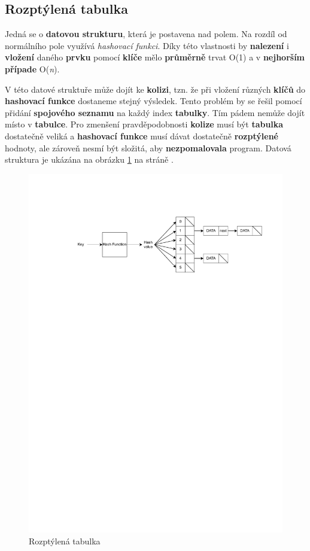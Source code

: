 \documentclass[12pt]{report}
\begin{document}
		\subsection{Rozptýlená tabulka}
			
			Jedná se o \textbf{datovou strukturu}, která je postavena nad polem. Na rozdíl od normálního pole využívá \textit{hashovací funkci}. Díky této vlastnosti by \textbf{nalezení} i \textbf{vložení} daného \textbf{prvku} pomocí \textbf{klíče} mělo \textbf{průměrně} trvat O(1) a v \textbf{nejhorším případe} O(\textit{n}).
			
			V této datové struktuře může dojít ke \textbf{kolizi}, tzn. že při vložení různých \textbf{klíčů} do \textbf{hashovací funkce} dostaneme stejný výsledek. Tento problém by se řešil pomocí přidání \textbf{spojového seznamu} na každý index \textbf{tabulky}. Tím pádem nemůže dojít místo v \textbf{tabulce}. Pro zmenšení pravděpodobnosti \textbf{kolize} musí být \textbf{tabulka} dostatečně veliká a \textbf{hashovací funkce} musí dávat dostatečně \textbf{rozptýlené} hodnoty, ale zároveň nesmí být složitá, aby \textbf{nezpomalovala} program. Datová struktura je ukázána na obrázku \ref{fig:hashtable} na stráně \pageref{fig:hashtable}. 
			
			\begin{figure}[h]
				\centering
				\includegraphics[width=.7\textwidth]{img/hashtable}
				\caption{Rozptýlená tabulka}
				\label{fig:hashtable}
			\end{figure}
		
\end{document}
